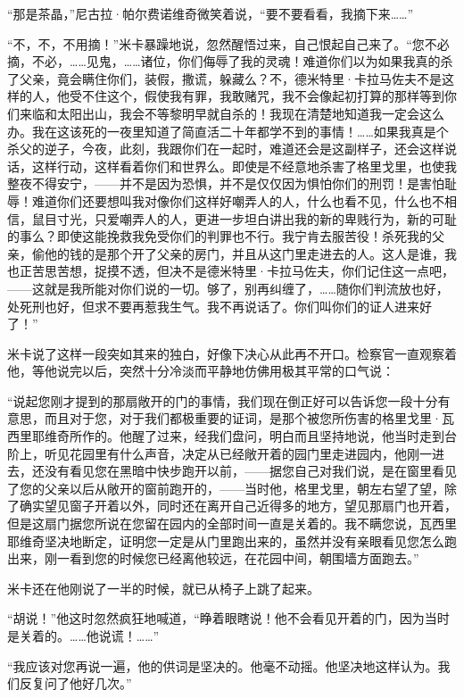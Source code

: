 \par “那是茶晶，”尼古拉·帕尔费诺维奇微笑着说，“要不要看看，我摘下来……”
\par “不，不，不用摘！”米卡暴躁地说，忽然醒悟过来，自己恨起自己来了。“您不必摘，不必，……见鬼，……诸位，你们侮辱了我的灵魂！难道你们以为如果我真的杀了父亲，竟会瞒住你们，装假，撒谎，躲藏么？不，德米特里·卡拉马佐夫不是这样的人，他受不住这个，假使我有罪，我敢赌咒，我不会像起初打算的那样等到你们来临和太阳出山，我会不等黎明早就自杀的！我现在清楚地知道我一定会这么办。我在这该死的一夜里知道了简直活二十年都学不到的事情！……如果我真是个杀父的逆子，今夜，此刻，我跟你们在一起时，难道还会是这副样子，还会这样说话，这样行动，这样看着你们和世界么。即使是不经意地杀害了格里戈里，也使我整夜不得安宁，——并不是因为恐惧，并不是仅仅因为惧怕你们的刑罚！是害怕耻辱！难道你们还要想叫我对像你们这样好嘲弄人的人，什么也看不见，什么也不相信，鼠目寸光，只爱嘲弄人的人，更进一步坦白讲出我的新的卑贱行为，新的可耻的事么？即使这能挽救我免受你们的判罪也不行。我宁肯去服苦役！杀死我的父亲，偷他的钱的是那个开了父亲的房门，并且从这门里走进去的人。这人是谁，我也正苦思苦想，捉摸不透，但决不是德米特里·卡拉马佐夫，你们记住这一点吧，——这就是我所能对你们说的一切。够了，别再纠缠了，……随你们判流放也好，处死刑也好，但求不要再惹我生气。我不再说话了。你们叫你们的证人进来好了！”
\par 米卡说了这样一段突如其来的独白，好像下决心从此再不开口。检察官一直观察着他，等他说完以后，突然十分冷淡而平静地仿佛用极其平常的口气说：
\par “说起您刚才提到的那扇敞开的门的事情，我们现在倒正好可以告诉您一段十分有意思，而且对于您，对于我们都极重要的证词，是那个被您所伤害的格里戈里·瓦西里耶维奇所作的。他醒了过来，经我们盘问，明白而且坚持地说，他当时走到台阶上，听见花园里有什么声音，决定从已经敞开着的园门里走进园内，他刚一进去，还没有看见您在黑暗中快步跑开以前，——据您自己对我们说，是在窗里看见了您的父亲以后从敞开的窗前跑开的，——当时他，格里戈里，朝左右望了望，除了确实望见窗子开着以外，同时还在离开自己近得多的地方，望见那扇门也开着，但是这扇门据您所说在您留在园内的全部时间一直是关着的。我不瞒您说，瓦西里耶维奇坚决地断定，证明您一定是从门里跑出来的，虽然并没有亲眼看见您怎么跑出来，刚一看到您的时候您已经离他较远，在花园中间，朝围墙方面跑去。”
\par 米卡还在他刚说了一半的时候，就已从椅子上跳了起来。
\par “胡说！”他这时忽然疯狂地喊道，“睁着眼瞎说！他不会看见开着的门，因为当时是关着的。……他说谎！……”
\par “我应该对您再说一遍，他的供词是坚决的。他毫不动摇。他坚决地这样认为。我们反复问了他好几次。”
